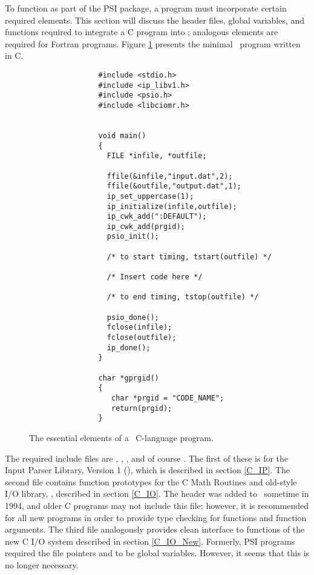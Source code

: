 %
%
%
%

To function as part of the PSI package, a program must incorporate
certain required elements.  This section will discuss the header
files, global variables, and functions 
required to integrate a C program into \PSIthree; analogous elements are required
for Fortran programs.  Figure \ref{fig:Essential_C_Program}
presents the minimal \PSIthree\ program written in C.

\begin{figure}
\begin{verbatim}
                #include <stdio.h>
                #include <ip_libv1.h>
                #include <psio.h>
                #include <libciomr.h>


                void main()
                {
                  FILE *infile, *outfile;

                  ffile(&infile,"input.dat",2);
                  ffile(&outfile,"output.dat",1);
                  ip_set_uppercase(1);
                  ip_initialize(infile,outfile);
                  ip_cwk_add(":DEFAULT");
                  ip_cwk_add(prgid);
                  psio_init();

                  /* to start timing, tstart(outfile) */
                
                  /* Insert code here */

                  /* to end timing, tstop(outfile) */

                  psio_done();
                  fclose(infile);
                  fclose(outfile);
                  ip_done();
                }

                char *gprgid()
                {
                   char *prgid = "CODE_NAME";
                   return(prgid);
                }               
\end{verbatim}
\caption{The essential elements of a \PSIthree\ C-language program.}
\label{fig:Essential_C_Program}
\end{figure}

The required include files are , , ,
and of course .  The first of these is for the Input Parser Library,
Version 1 (), which is described in section \ref{C_IP}.  The
second file contains function prototypes for the C Math Routines and old-style I/O
library, , described in section \ref{C_IO}.  The header
 was added to \PSItwo\ sometime in 1994, and older C programs
may not include this file; however, it is recommended for all new programs
in order to provide type checking for functions and function arguments.
The third file analogously provides clean interface to functions of the new C I/O system
described in section \ref{C_IO_New}.
Formerly, PSI programs required the file pointers  and 
to be global variables.  However, it seems that this is no longer necessary.

